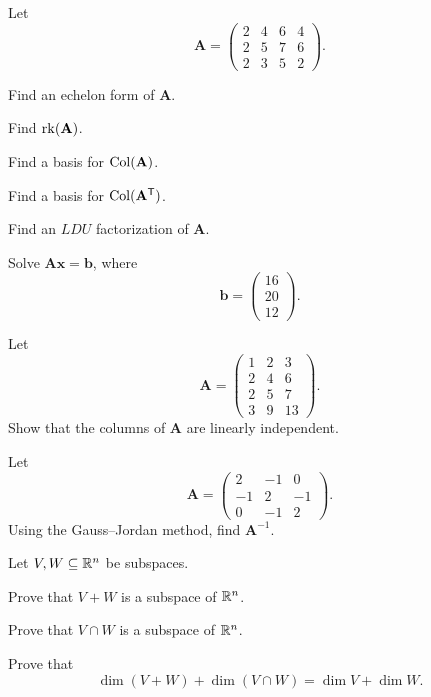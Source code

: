 \begin{problem}
Let
\[
\mathbf A=
\begin{pmatrix}
2&4&6&4\\
2&5&7&6\\
2&3&5&2
\end{pmatrix}.
\]
\begin{problemsubparts}
\item Find an echelon form of $\mathbf A$.
\item Find $\operatorname{rk}(\mathbf A)$.
\item Find a basis for $\operatorname{Col}(\mathbf A)$.
\item Find a basis for $\operatorname{Col}(\mathbf A^{\mathsf T})$.
\item Find an $LDU$ factorization of $\mathbf A$.
\item Solve $\mathbf A\mathbf x=\mathbf b$, where
\[
\mathbf b=
\begin{pmatrix}
16\\20\\12
\end{pmatrix}.
\]
\end{problemsubparts}
\end{problem}

\begin{problem}
Let
\[
\mathbf A=
\begin{pmatrix}
1&2&3\\
2&4&6\\
2&5&7\\
3&9&13
\end{pmatrix}.
\]
Show that the columns of $\mathbf A$ are linearly independent.
\end{problem}

\begin{problem}
Let
\[
\mathbf A=
\begin{pmatrix}
2&-1&0\\
-1&2&-1\\
0&-1&2
\end{pmatrix}.
\]
Using the Gauss--Jordan method, find $\mathbf A^{-1}$.
\end{problem}

\begin{problem}
Let $V,W\subseteq\mathbb{R}^n$ be subspaces.
\begin{problemsubparts}
\item Prove that $V+W$ is a subspace of $\mathbb{R}^n$.
\item Prove that $V\cap W$ is a subspace of $\mathbb{R}^n$.
\item Prove that
\[
\dim(V+W)+\dim(V\cap W)=\dim V+\dim W.
\]
\end{problemsubparts}
\end{problem}



